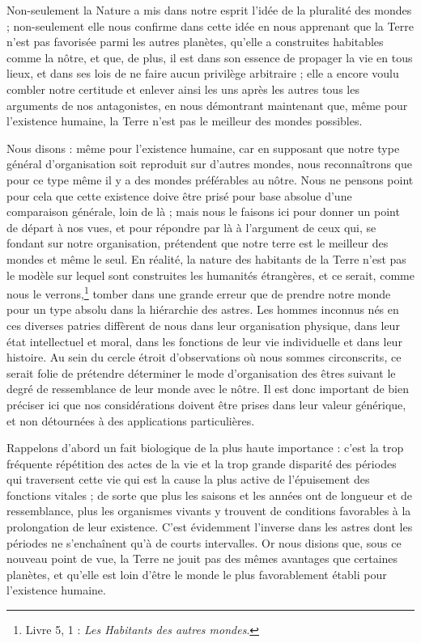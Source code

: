 \documentclass[a4paper, 11pt, oneside, landscape]{article}
\begin{document}
Non-seulement la Nature a mis dans notre esprit l'idée de la pluralité des mondes ; non-seulement elle nous confirme dans cette idée en nous apprenant que la Terre n'est pas favorisée parmi les autres planètes, qu'elle a construites habitables comme la nôtre, et que, de plus, il est dans son essence de propager la vie en tous lieux, et dans ses lois de ne faire aucun privilège arbitraire ; elle a encore voulu combler notre certitude et enlever ainsi les uns après les autres tous les arguments de nos antagonistes, en nous démontrant maintenant que, même pour l'existence humaine, la Terre n'est pas le meilleur des mondes possibles.

Nous disons : même pour l'existence humaine, car en supposant que notre type général d'organisation soit reproduit sur d'autres mondes, nous reconnaîtrons que pour ce type même il y a des mondes préférables au nôtre. Nous ne pensons point pour cela que cette existence doive être prisé pour base absolue d'une comparaison générale, loin de là ; mais nous le faisons ici pour donner un point de départ à nos vues, et pour répondre par là à l'argument de ceux qui, se fondant sur notre organisation, prétendent que notre terre est le meilleur des mondes et même le seul. En réalité, la nature des habitants de la Terre n'est pas le modèle sur lequel sont construites les humanités étrangères, et ce serait, comme nous le verrons,\footnote{Livre 5, 1 : \emph{Les Habitants des autres mondes}.} tomber dans une grande erreur que de prendre notre monde pour un type absolu dans la hiérarchie des astres. Les hommes inconnus nés en ces diverses patries diffèrent de nous dans leur organisation physique, dans leur état intellectuel et moral, dans les fonctions de leur vie individuelle et dans leur histoire. Au sein du cercle étroit d'observations où nous sommes circonscrits, ce serait folie de prétendre déterminer le mode d'organisation des êtres suivant le degré de ressemblance de leur monde avec le nôtre. Il est donc important de bien préciser ici que nos considérations doivent être prises dans leur valeur générique, et non détournées à des applications particulières.

Rappelons d'abord un fait biologique de la plus haute importance : c'est la trop fréquente répétition des actes de la vie et la trop grande disparité des périodes qui traversent cette vie qui est la cause la plus active de l'épuisement des fonctions vitales ; de sorte que plus les saisons et les années ont de longueur et de ressemblance, plus les organismes vivants y trouvent de conditions favorables à la prolongation de leur existence. C'est évidemment l'inverse dans les astres dont les périodes ne s'enchaînent qu'à de courts intervalles. Or nous disions que, sous ce nouveau point de vue, la Terre ne jouit pas des mêmes avantages que certaines planètes, et qu'elle est loin d'être le monde le plus favorablement établi pour l'existence humaine.
\end{document}
